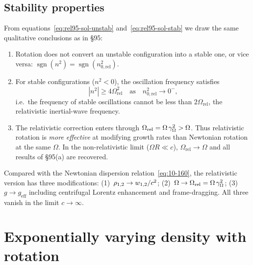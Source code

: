 \subsection{Stability properties}

From equations~\eqref{eq:rel95-sol-unstab}
and~\eqref{eq:rel95-sol-stab} we draw the same qualitative
conclusions as in \S95:
\begin{enumerate}
\item Rotation does not convert an unstable configuration into a
  stable one, or vice versa: $\operatorname{sgn}(n^{2})
  = \operatorname{sgn}(n_{0,\mathrm{rel}}^{2})$.

\item For stable configurations ($n^{2}<0$), the oscillation
  frequency satisfies
  \begin{equation}
    |n^{2}| \geq 4\Omega_{\mathrm{rel}}^{2}
    \quad\text{as}\quad n_{0,\mathrm{rel}}^{2}\to 0^{-},
    \label{eq:rel95-freq-bound}
  \end{equation}
  i.e.\ the frequency of stable oscillations cannot be less than
  $2\Omega_{\mathrm{rel}}$, the relativistic inertial-wave frequency.

\item The relativistic correction enters through
  $\Omega_{\mathrm{rel}} = \Omega\,\gamma_{\Omega}^{2}>\Omega$.
  Thus relativistic rotation is \emph{more effective} at modifying
  growth rates than Newtonian rotation at the same $\Omega$.
  In the non-relativistic limit ($\Omega R\ll c$),
  $\Omega_{\mathrm{rel}}\to\Omega$ and all results of \S95(a) are
  recovered.
\end{enumerate}

\begin{relcorrection}
Compared with the Newtonian dispersion
relation~\eqref{eq:10-160}, the relativistic version has three
modifications: (1)~$\rho_{1,2}\to w_{1,2}/c^{2}$;
(2)~$\Omega\to\Omega_{\mathrm{rel}}=\Omega\,\gamma_{\Omega}^{2}$;
(3)~$g\to g_{\mathrm{eff}}$ including centrifugal Lorentz enhancement
and frame-dragging.  All three vanish in the limit $c\to\infty$.
\end{relcorrection}

\section{Exponentially varying density with rotation}
\label{sec:rel-95-exp}

